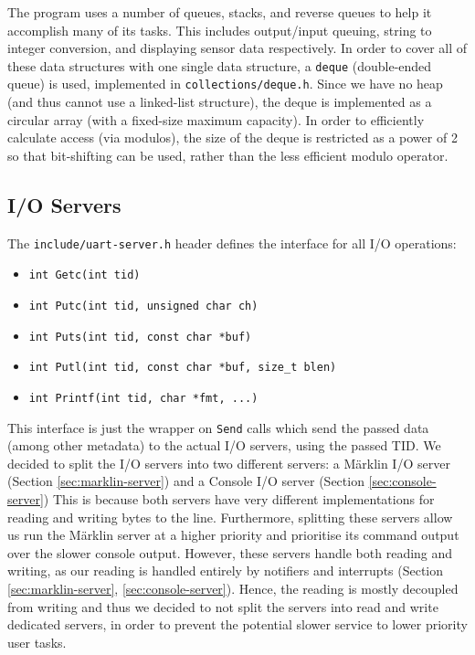 \documentclass[12pt, titlepage]{article}
\begin{document}
    The program uses a number of queues, stacks, and reverse queues to help it accomplish many of its tasks. This includes output/input queuing, string to integer conversion, and displaying sensor data respectively. In order to cover all of these data structures with one single data structure, a \verb`deque` (double-ended queue) is used, implemented in \verb`collections/deque.h`. Since we have no heap (and thus cannot use a linked-list structure), the deque is implemented as a circular array (with a fixed-size maximum capacity). In order to efficiently calculate access (via modulos), the size of the deque is restricted as a power of 2 so that bit-shifting can be used, rather than the less efficient modulo operator.
    
    \subsection{I/O Servers}
    \label{sec:io-servers}

    The \verb'include/uart-server.h' header defines the interface for all I/O operations:
    \begin{itemize}
        \item \verb'int Getc(int tid)'
        \item \verb'int Putc(int tid, unsigned char ch)'
        \item \verb'int Puts(int tid, const char *buf)'
        \item \verb'int Putl(int tid, const char *buf, size_t blen)'
        \item \verb'int Printf(int tid, char *fmt, ...)'
    \end{itemize}
    
    This interface is just the wrapper on \verb`Send` calls which send the passed data (among other metadata) to the actual I/O servers, using the passed TID. 
    We decided to split the I/O servers into two different servers: a Märklin I/O server (Section \ref{sec:marklin-server}) and a Console I/O server (Section \ref{sec:console-server})
    This is because both servers have very different implementations for reading and writing bytes to the line.
    Furthermore, splitting these servers allow us run the Märklin server at a higher priority and prioritise its command output over the slower console output.
    However, these servers handle both reading and writing, as our reading is handled entirely by notifiers and interrupts (Section \ref{sec:marklin-server}, \ref{sec:console-server}). 
    Hence, the reading is mostly decoupled from writing and thus we decided to not split the servers into read and write dedicated servers, in order to prevent the potential slower service to lower priority user tasks.
    
\end{document}
